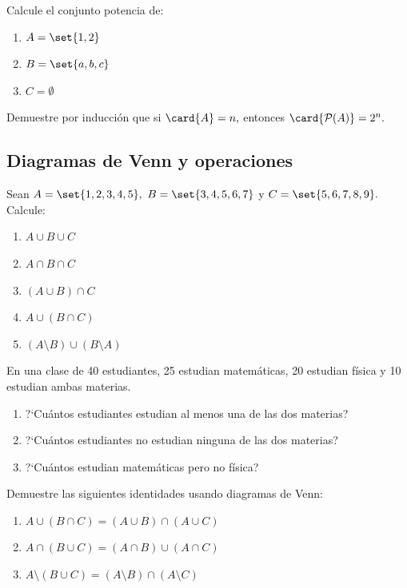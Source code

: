 \begin{problema}
	Calcule el conjunto potencia de:
	\begin{enumerate}
		\item $A = \set{1,2}$
		\item $B = \set{a,b,c}$
		\item $C = \emptyset$
	\end{enumerate}
\end{problema}

\begin{problema}
	Demuestre por inducción que si $\card{A} = n,$ entonces $\card{\mathcal{P}(A)} = 2^{n}.$
\end{problema}

\subsection*{Diagramas de Venn y operaciones}

\begin{problema}
	Sean $A = \set{1,2,3,4,5},$ $B = \set{3,4,5,6,7}$ y $C = \set{5,6,7,8,9}.$ Calcule:
	\begin{enumerate}
		\item $A \cup B \cup C$
		\item $A \cap B \cap C$
		\item $(A \cup B) \cap C$
		\item $A \cup (B \cap C)$
		\item $(A \setminus B) \cup (B \setminus A)$
	\end{enumerate}
\end{problema}

\begin{problema}
	En una clase de 40 estudiantes, 25 estudian matemáticas, 20 estudian física y 10 estudian ambas materias.
	\begin{enumerate}
		\item ?`Cuántos estudiantes estudian al menos una de las dos materias?
		\item ?`Cuántos estudiantes no estudian ninguna de las dos materias?
		\item ?`Cuántos estudian matemáticas pero no física?
	\end{enumerate}
\end{problema}

\begin{problema}
	Demuestre las siguientes identidades usando diagramas de Venn:
	\begin{enumerate}
		\item $A \cup (B \cap C) = (A \cup B) \cap (A \cup C)$
		\item $A \cap (B \cup C) = (A \cap B) \cup (A \cap C)$
		\item $A \setminus (B \cup C) = (A \setminus B) \cap (A \setminus C)$
	\end{enumerate}
\end{problema}

